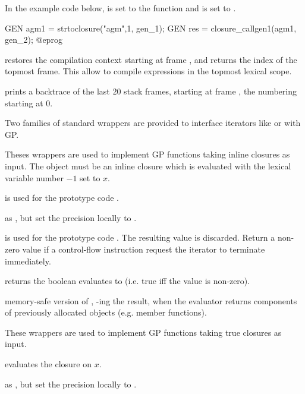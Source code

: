 In the example code below,  is set to the function
 and  is set to .

\bprog
  GEN agm1 = strtoclosure("agm",1, gen_1);
  GEN res = closure_callgen1(agm1, gen_2);
@eprog

 restores the compilation context starting
at frame , and returns the index of the topmost frame. This allow to
compile expressions in the topmost lexical scope.

 prints a backtrace of the last $20$ stack
frames, starting at frame , the numbering starting at $0$.

Two families of standard wrappers are provided to interface iterators like
 or  with GP.

Theses wrappers are used to implement GP functions taking inline closures as
input. The object  must be an inline closure which is evaluated
with the lexical variable number $-1$ set to $x$.

 is used for the prototype code .

 as , but
set the precision locally to .

 is used for the prototype code
. The resulting value is discarded.  Return a non-zero value if a
control-flow instruction request the iterator to terminate immediately.

 returns the boolean
 evaluates to (i.e. true iff the value is non-zero).

 memory-safe version of ,
-ing the result, when the evaluator returns components of
previously allocated objects (e.g. member functions).

These wrappers are used to implement GP functions taking true closures as
input.

 evaluates the closure  on $x$.

 as ,
but set the precision locally to .

